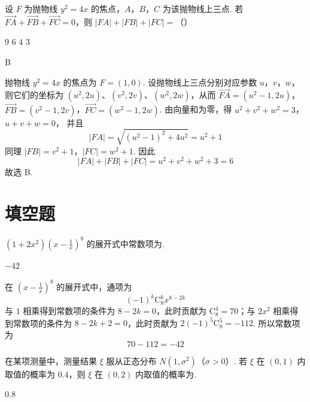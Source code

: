 \begin{problem}
设 \(F\) 为抛物线 \(y^{2} = 4x\) 的焦点，\(A\)，\(B\)，\(C\) 为该抛物线上三点. 若 \(\overrightarrow{FA} + \overrightarrow{FB} + \overrightarrow{FC} = 0\)，则 \(|FA| + |FB| + |FC| =\)（\quad）

\choices
    {\(9\)}
    {\(6\)}
    {\(4\)}
    {\(3\)}
\end{problem}

\begin{answer}
B
\end{answer}

\begin{solution}
抛物线 \(y^2=4x\) 的焦点为 \(F=(1,0)\). 设抛物线上三点分别对应参数 \(u\)，\(v\)，\(w\)，则它们的坐标为 \((u^2,2u)\)、\((v^2,2v)\)、\((w^2,2w)\)，从而
\(\overrightarrow{FA}=(u^2-1,2u)\)，\(\overrightarrow{FB}=(v^2-1,2v)\)，\(\overrightarrow{FC}=(w^2-1,2w)\).
由向量和为零，得
\(u^2+v^2+w^2=3\)，\(u+v+w=0\)，
并且
\[
|FA|=\sqrt{(u^2-1)^2+4u^2}=u^2+1
\]
同理 \(|FB|=v^2+1\)，\(|FC|=w^2+1\). 因此
\[
|FA|+|FB|+|FC|=u^2+v^2+w^2+3=6
\]
故选 B.
\end{solution}

\section{填空题}
\begin{problem}
\((1 + 2x^{2})\left(x - \frac{1}{x}\right)^{8}\) 的展开式中常数项为\fillinblank{}.
\end{problem}

\begin{answer}
\(-42\)
\end{answer}

\begin{solution}
在 \(\left(x-\frac1x\right)^8\) 的展开式中，通项为
\[
(-1)^k\mathrm C_8^k x^{8-2k}
\]
与 \(1\) 相乘得到常数项的条件为 \(8-2k=0\)，此时贡献为 \(\mathrm C_8^4=70\)；与 \(2x^2\) 相乘得到常数项的条件为 \(8-2k+2=0\)，此时贡献为 \(2(-1)^5\mathrm C_8^5=-112\). 所以常数项为
\[
70-112=-42
\]
\end{solution}

\begin{problem}
在某项测量中，测量结果 \(\xi\) 服从正态分布 \(N(1, \sigma^2)\)（\(\sigma > 0\)）. 若 \(\xi\) 在 \((0, 1)\) 内取值的概率为 \(0.4\)，则 \(\xi\) 在 \((0, 2)\) 内取值的概率为\fillinblank{}.
\end{problem}

\begin{answer}
\(0.8\)
\end{answer}

